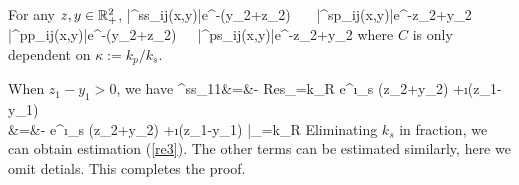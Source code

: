 \documentclass[12pt]{iopart}
\begin{document}
\finproof

\begin{lem} \label{r_estimate2}
	For any $z,y\in {\mathbb{R}}^2_+$,
	\be\label{re3}\hspace{-2cm}
	|{}^{ss}_{ij}(x,y)|\le{}e^{-(y_2+z_2)} \ \ \
	|{}^{sp}_{ij}(x,y)|\le{}e^{-z_2+y_2}\\ \hspace{-2cm}
	|{}^{pp}_{ij}(x,y)|\le{}e^{-(y_2+z_2)}\ \ \
	|{\MyRoman{2}}^{ps}_{ij}(x,y)|\le\frac{C}{\mu}e^{-\sqrt{k_R^2-k_p^2}z_2+y_2}
	\ee
	where $C$ is only dependent on $\kappa:=k_p/k_s$.
\end{lem}
\debproof
When $z_1-y_1>0$, we have
\ben
{}^{ss}_{11}&=&- Res_{\xi=k_R} e^{\i\mu_s (z_2+y_2) +\i\xi(z_1-y_1)} \\
&=&- e^{\i\mu_s (z_2+y_2) +\i\xi(z_1-y_1)} |_{\xi=k_R}
\een
Eliminating $k_s$ in fraction, we can obtain estimation (\ref{re3}). The other terms can be estimated similarly, here we omit detials. This completes the proof.
\finproof
\end{document}
